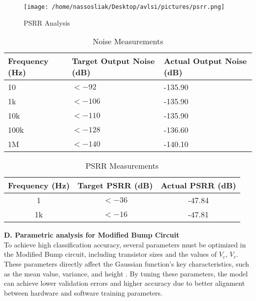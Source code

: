 \documentclass[conference]{IEEEtran}
\begin{document}
\begin{figure}[!h]
    \centering
    \texttt{[image: /home/nassosliak/Desktop/avlsi/pictures/psrr.png]}
    \caption{PSRR Analysis}
    \label{fig:psrr}
\end{figure}


\begin{table}[!h]
    \centering
\large
\begin{tabular}{|p{2.5cm}|p{2.5cm}|p{2.5cm}|}
        \hline

        \textbf{Frequency (Hz)} & \textbf{Target Output Noise (dB)} & \textbf{Actual Output Noise (dB)} \\
        \hline
        10   & $< -92$  &-135.90 \\
        \hline
        1k   & $< -106$ & -135.90\\
        \hline
        10k  & $< -110$ & -135.90 \\
        \hline
        100k & $< -128$ & -136.60 \\
        \hline
        1M   & $< -140$ & -140.10 \\
        \hline
    \end{tabular}
\vspace{0.5cm}
    \caption{Noise Measurements}
    \label{tab:results}
\end{table}

\begin{table}[!h]
    \centering

    \begin{tabular}{|c|c|c|}
        \hline
        \textbf{Frequency (Hz)} & \textbf{Target PSRR (dB)} & \textbf{Actual PSRR (dB)} \\
        \hline
        1   & $< -36$  & -47.84 \\
        \hline
        1k   & $< -16$ & -47.81\\
        \hline
    \end{tabular}
\vspace{0.5cm}
    \caption{PSRR Measurements}
    \label{tab:psrr}
\end{table}
\textbf{D. Parametric analysis for Modified Bump Circuit}\\
To achieve high classification accuracy, several parameters must be optimized in the Modified Bump circuit, including transistor sizes and the values of \( V_c \), \( V_r \). These parameters directly affect the Gaussian function's key characteristics, such as the mean value, variance, and height \cite{electronics10202530}. By tuning these parameters, the model can achieve lower validation errors and higher accuracy due to better alignment between hardware and software training parameters.
\end{document}
